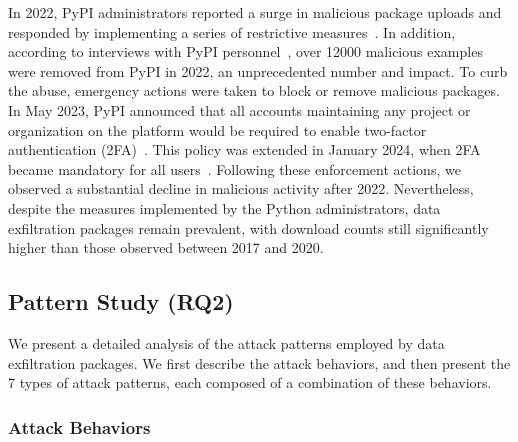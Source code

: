 In 2022, PyPI administrators reported a surge in malicious package uploads and responded by implementing a series of restrictive measures~\cite{PyPIPhishing2022}. In addition, according to interviews with PyPI personnel~\cite{vu2023bad}, over 12000 malicious examples were removed from PyPI in 2022, an unprecedented number and impact. To curb the abuse, emergency actions were taken to block or remove malicious packages. In May 2023, PyPI announced that all accounts maintaining any project or organization on the platform would be required to enable two-factor authentication (2FA)~\cite{PyPI-2FA-2023}. This policy was extended in January 2024, when 2FA became mandatory for all users~\cite{PyPI-2FA-2024}. Following these enforcement actions, we observed a substantial decline in malicious activity after 2022. Nevertheless, despite the measures implemented by the Python administrators, data exfiltration packages remain prevalent, with download counts still significantly higher than those observed between 2017 and 2020.

\subsection{Pattern Study (RQ2)}\label{sec:pattern_study}

We present a detailed analysis of the attack patterns employed by data exfiltration packages. We first describe the attack behaviors, and then present the 7 types of attack patterns, each composed of a combination of these behaviors.

\subsubsection{Attack Behaviors}

